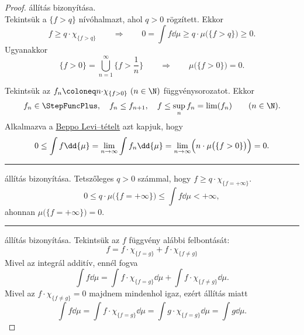 \documentclass[
]{elteikthesis}[2024/04/26]
\begin{document}
	\begin{proof}
		 állítás bizonyítása.\\[6pt]
		\Ifstep Tekintsük a \( \{ f > q \} \) nívóhalmazt, ahol \( q > 0 \) rögzített. Ekkor
		\[
			f \geq q \cdot \chi_{\{ f > q \}}
			\qquad \Longrightarrow \qquad
			0 = 
			\int f \dd{\mu} \geq 
			q \cdot \mu \bigl( \{ f > q \} \bigr) \geq 0.
		\]
		Ugyanakkor
		\[
			\{ f > 0 \} = 
			\bigcup_{n = 1}^{\infty} \biggl\{ f > \frac{1}{n} \biggr\}
			\qquad \Longrightarrow \qquad
			\mu \bigl( \{ f > 0 \} \bigr) = 0.
		\]
		
		\Backifstep Tekintsük az \( f_n \coloneq n {\cdot} \chi_{\{ f > 0 \}}  \ (n \in \N) \) függvénysorozatot. Ekkor
		\[
			f_n \in \StepFuncPlus, \quad
			f_n \leq f_{n + 1}, \quad
			f \leq \sup_{n} f_n = \lim( f_n )
			\qquad (n \in \N).
		\]
		Alkalmazva a \hyperref[th:beppo-levi]{Beppo Levi--tételt} azt kapjuk, hogy
		\[
			0 \leq
			\int f \dd{\mu} =
			\lim_{n \to \infty} \int f_n \dd{\mu} = 
			\lim_{n \to \infty} \Bigl( n \cdot \mu \bigl( \{ f > 0 \} \bigr) \Bigr) = 0.
		\]
		
		\vspace{6pt}
		\hrule
		\vspace{9pt}
		
		 állítás bizonyítása.
		Tetszőleges \( q > 0 \) számmal, hogy \( f \geq q {\cdot} \chi_{\{ f = +\infty \}} \).
		\[
			0 \leq
			q \cdot \mu\bigl( \{ f = +\infty \} \bigr) \leq 
			\int f \dd{\mu}
			< +\infty,
		\]
		ahonnan \( \mu \bigl( \{ f = +\infty \} \bigr) = 0 \).
		
		\vspace{6pt}
		\hrule
		\vspace{9pt}
		
		 állítás bizonyítása.
		Tekintsük az \( f \) függvény alábbi felbontását:
		\[
			f = f \cdot \chi_{\{ f = g \}} + f \cdot \chi_{\{ f \neq g \}}
		\]
		Mivel az integrál additív, ennél fogva
		\[
			\int f \dd{\mu} =
			\int f {\cdot} \chi_{\{ f = g \}} \dd{\mu} +
			\int f {\cdot} \chi_{\{ f \neq g \}} \dd{\mu}.
		\]
		Mivel az \( f {\cdot} \chi_{\{ f \neq g \}} = 0 \) majdnem mindenhol igaz, 
		ezért  állítás miatt
		\[
			\int f \dd{\mu} =
			\int f {\cdot} \chi_{\{ f = g \}} \dd{\mu} =
			\int g {\cdot} \chi_{\{ f = g \}} \dd{\mu} =
			\int g \dd{\mu}.
		\]
	\end{proof}
	
\end{document}
